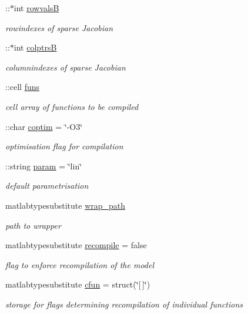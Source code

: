 \begin{DoxyCompactItemize}
\+::$\ast$int \hyperlink{classamimodel_a1ba81ee0e28fe7c7576911973c82be70}{rowvals\+B}
\begin{DoxyCompactList}\small\item\em rowindexes of sparse Jacobian \end{DoxyCompactList}\item 
\+::$\ast$int \hyperlink{classamimodel_a3a4891c5565b544dd7d4362dbbfaadf7}{colptrs\+B}
\begin{DoxyCompactList}\small\item\em columnindexes of sparse Jacobian \end{DoxyCompactList}\item 
\+::cell \hyperlink{classamimodel_af80b2560853c3df2b09fef2a198cf5b8}{funs}
\begin{DoxyCompactList}\small\item\em cell array of functions to be compiled \end{DoxyCompactList}\item 
\+::char \hyperlink{classamimodel_ad99abcd270ac97546c46292ebc6c2e0a}{coptim} = \char`\"{}-\/O3\char`\"{}
\begin{DoxyCompactList}\small\item\em optimisation flag for compilation \end{DoxyCompactList}\item 
\+::string \hyperlink{classamimodel_a51f20d6b1b54a2eee3be0e8adc96a0ae}{param} = \char`\"{}lin\char`\"{}
\begin{DoxyCompactList}\small\item\em default parametrisation \end{DoxyCompactList}\item 
matlabtypesubstitute \hyperlink{classamimodel_a0b316a20054ba282555674d939a82406}{wrap\+\_\+path}
\begin{DoxyCompactList}\small\item\em path to wrapper \end{DoxyCompactList}\item 
matlabtypesubstitute \hyperlink{classamimodel_a8d2e824e03e32034b634a7c48f2a26c6}{recompile} = false
\begin{DoxyCompactList}\small\item\em flag to enforce recompilation of the model \end{DoxyCompactList}\item 
matlabtypesubstitute \hyperlink{classamimodel_afec809c626a350367485aa6aaea6b585}{cfun} = struct(\char`\"{}\mbox{[}$\,$\mbox{]}\char`\"{})
\begin{DoxyCompactList}\small\item\em storage for flags determining recompilation of individual functions \end{DoxyCompactList}\item 

\end{DoxyCompactItemize}

